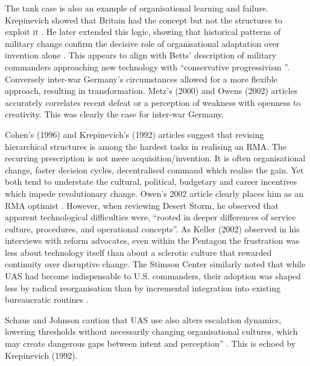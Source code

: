 The tank case is also an example of organisational learning and failure. Krepinevich showed that Britain had the concept but not the structures to exploit it \parencite{KREPINEVICH_1992}. He later extended this logic, showing that historical patterns of military change confirm the decisive role of organisational adaptation over invention alone \parencite{KREPINEVICH_1994}. This appears to align with Betts' description of military commanders approaching new technology with ``conservative progressivism  ''\parencite{BETTS_1996}.  Conversely inter-war Germany's circumstances allowed for a more flexible approach, resulting in transformation. Metz's (2000) and Owens (2002) articles accurately correlates recent defeat or a perception of weakness with openness to creativity\nocite{METZ_2000,OWENS_2002}. This was clearly the case for inter-war Germany.



Cohen's (1996) and Krepinevich's (1992) articles suggest that revising hierarchical structures is among the hardest tasks in realising an RMA. The recurring prescription is not mere acquisition/invention. It is often organisational change, faster decision cycles, decentralised command which realise the gain. Yet both tend to understate the cultural, political, budgetary and career incentives which impede revolutionary change\nocite{COHEN_1995,COHEN_1996,KREP_1992}. Owen's 2002 article clearly places him as an RMA optimist \nocite{OWENS_2002}. However, when reviewing Desert Storm, he observed that apparent technological difficulties were, ``rooted in deeper differences of service culture, procedures, and operational concepts''. As Keller (2002) observed in his interviews with reform advocates, even within the Pentagon the frustration was less about technology itself than about a sclerotic culture that rewarded continuity over disruptive change\nocite{KELLER_2002}. The Stimson Center similarly noted that while UAS had become indispensable to U.S. commanders, their adoption was shaped less by radical reorganisation than by incremental integration into existing bureaucratic routines \parencite{STIMSON_2015}.

 Schaus and Johnson caution that UAS use also alters escalation dynamics, lowering thresholds without necessarily changing organisational cultures, which may create dangerous gaps between intent and perception” \parencite{SCHAUS_2018}. This is echoed by Krepinevich (1992).


